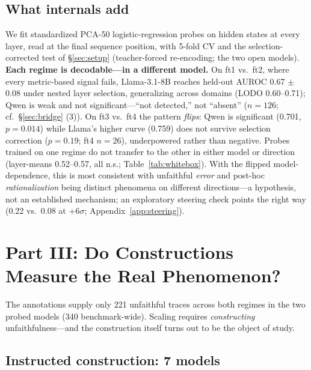 \documentclass[11pt]{article}
\begin{document}
\subsection{What internals add}
\label{sec:internals}
We fit standardized PCA-50 logistic-regression probes on hidden states at every layer, read at the final sequence position, with 5-fold CV and the selection-corrected test of \S\ref{sec:setup} (teacher-forced re-encoding; the two open models). \textbf{Each regime is decodable---in a different model.} On ft1 vs.\ ft2, where every metric-based signal fails, Llama-3.1-8B reaches held-out AUROC 0.67 $\pm$ 0.08 under nested layer selection, generalizing across domains (LODO 0.60--0.71); Qwen is weak and not significant---``not detected,'' not ``absent'' ($n{=}126$; cf.\ \S\ref{sec:bridge} (3)). On ft3 vs.\ ft4 the pattern \emph{flips}: Qwen is significant (0.701, $p{=}0.014$) while Llama's higher curve (0.759) does not survive selection correction ($p{=}0.19$; ft4 $n{=}26$), underpowered rather than negative. Probes trained on one regime do not transfer to the other in either model or direction (layer-means 0.52--0.57, all n.s.; Table~\ref{tab:whitebox}). With the flipped model-dependence, this is most consistent with unfaithful \emph{error} and post-hoc \emph{rationalization} being distinct phenomena on different directions---a hypothesis, not an established mechanism; an exploratory steering check points the right way (0.22 vs.\ 0.08 at $+6\sigma$; Appendix~\ref{app:steering}).

\section{Part III: Do Constructions Measure the Real Phenomenon?}
\label{sec:construction}

The annotations supply only 221 unfaithful traces across both regimes in the two probed models (340 benchmark-wide). Scaling requires \emph{constructing} unfaithfulness---and the construction itself turns out to be the object of study.

\subsection{Instructed construction: 7 models}
\label{sec:synth}
\end{document}
